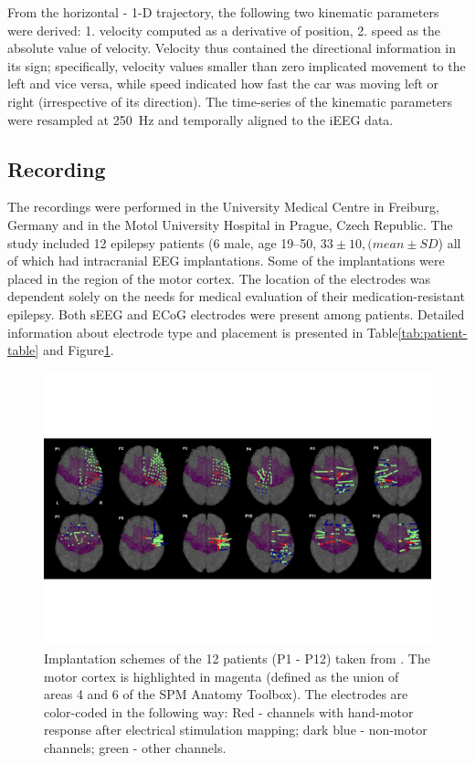 From the horizontal - 1-D trajectory, the following two kinematic parameters were derived:
1. velocity computed as a derivative of position, 2. speed as the absolute value of velocity.
Velocity thus contained the directional information in its sign;
specifically, velocity values smaller than zero implicated movement to the left and vice versa, while speed indicated how fast the car was moving left or right (irrespective of its direction).
The time-series of the kinematic parameters were resampled at 250~Hz and temporally aligned to the iEEG data.

\subsection{Recording}\label{subsec:recording}
The recordings were performed in the University Medical Centre in Freiburg, Germany and in the Motol University Hospital in Prague, Czech Republic.
The study included 12 epilepsy patients (6 male, age 19--50, $ 33 \pm 10, (mean \pm SD $) all of which had intracranial EEG implantations.
Some of the implantations were placed in the region of the motor cortex.
The location of the electrodes was dependent solely on the needs for medical evaluation of their medication-resistant epilepsy.
Both sEEG and ECoG electrodes were present among patients.
Detailed information about electrode type and placement is presented in Table\ref{tab:patient-table} and Figure\ref{fig:electrodes}.

\begin{figure}[!htbp]
\centering
\includegraphics[width=0.8\linewidth]{img/ch3/electrodes}
\caption{Implantation schemes of the 12 patients (P1 - P12) taken from \cite{Hammer-2021}. The motor cortex is highlighted in magenta (defined as the union of areas 4 and 6 of the SPM Anatomy Toolbox). The electrodes are color-coded in the following way: Red - channels with hand-motor response after electrical stimulation mapping; dark blue - non-motor channels; green - other channels.}
\label{fig:electrodes}
\end{figure}

